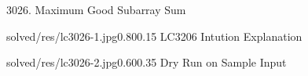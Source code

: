 \begin{problem}{3026. Maximum Good Subarray Sum}
    

\end{problem}

\begin{fullwidth}
\begin{solution}[Ad-Hoc | $O(n^2)$ ]


    \begin{lfigure}{solved/res/lc3026-1.jpg}{0.80}{0.15}
        LC3206 Intution Explanation
    \end{lfigure}


    \begin{lfigure}{solved/res/lc3026-2.jpg}{0.60}{0.35}
        Dry Run on Sample Input
    \end{lfigure}
\end{solution}

\end{fullwidth}
    